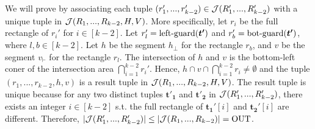 
 We will prove by associating each tuple $(r_1',...,r_{k-2}')\in \mathcal{J}(R_1',...,R_{k-2}')$ with a unique tuple in $\mathcal{J}(R_1,...,R_{k-2},H,V)$. More specifically, let $r_i$ be the full rectangle of $r_i'$ for $i\in[k-2]$. Let $r'_l = \mathrm{left\text{-}guard}(\textrm{\boldmath${t'}$})$ and $r'_b = \mathrm{bot\text{-}guard}(\textrm{\boldmath${t'}$})$, where $l,b\in[k-2]$. Let $h$ be the segment $h_\bot$ for the rectangle $r_b$, and $v$ be the segment $v_\vdash$ for the rectangle $r_l$. The intersection of $h$ and $v$ is the bottom-left coner of the intersection area $\bigcap_{i = 1}^{k-2}r_i'$. Hence, $h\cap v\cap \bigcap_{i = 1}^{k-2}r_i \neq \emptyset$ and the tuple $(r_1,...,r_{k-2},h,v)$ is a result tuple in $\mathcal{J}(R_1,...,R_{k-2},H,V)$. The result tuple is unique because for any two distinct tuples $\bm{t'_1}$ and $\bm{t'_2}$ in $\mathcal{J}(R_1',...,R_{k-2}')$, there exists an integer $i \in [k-2]$ s.t. the full rectangle of $\bm{t_1'}[i]$ and $\bm{t_2'}[i]$ are different. Therefore, $|\mathcal{J}(R_1',...,R_{k-2}')| \leq |\mathcal{J}(R_1,...,R_{k-2})| = \mathrm{OUT}$.








